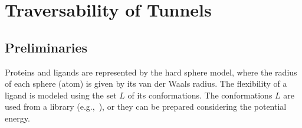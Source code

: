 \documentclass{svmult}
\def\L{L}
\begin{document}


\section{Traversability of Tunnels}

\subsection{Preliminaries}

Proteins and ligands are represented by the hard sphere model, where the radius of each sphere (atom) is given by its van der Waals radius.
The flexibility of a ligand is modeled using the set $\L$ of its conformations.
The conformations $L$ are used from a library (e.g.,~\cite{dunbrack}), or they can be prepared considering the potential energy.


\end{document}
